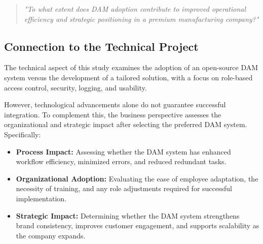 \documentclass[a4paper,12pt,twocolumn]{article}
\begin{document}
\begin{quote}
    \textit{"To what extent does DAM adoption contribute to improved operational efficiency and strategic positioning in a premium manufacturing company?"}
\end{quote}

\subsection{Connection to the Technical Project}
The technical aspect of this study examines the adoption of an open-source DAM system versus 
the development of a tailored solution, with a focus on role-based access control, security, 
logging, and usability. 

\vspace{0.3cm} 
However, technological advancements alone do not guarantee successful integration. To complement this,
the business perspective assesses the organizational and strategic impact after selecting the preferred DAM system. Specifically:
\begin{itemize}
    \item \textbf{Process Impact:} Assessing whether the DAM system has enhanced workflow efficiency, minimized errors, and reduced redundant tasks.
    \item \textbf{Organizational Adoption:} Evaluating the ease of employee adaptation, the necessity of training, and any role adjustments required for successful implementation.
    \item \textbf{Strategic Impact:} Determining whether the DAM system strengthens brand consistency, improves customer engagement, and supports scalability as the company expands.
\end{itemize}


\end{document}
